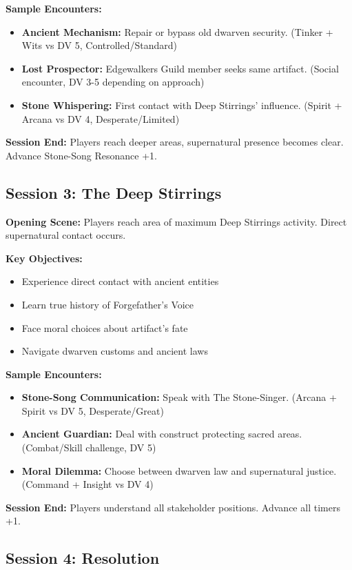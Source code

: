\documentclass[11pt]{article}
\begin{document}
\textbf{Sample Encounters:}
\begin{itemize}
\item \textbf{Ancient Mechanism:} Repair or bypass old dwarven security. (Tinker + Wits vs DV 5, Controlled/Standard)
\item \textbf{Lost Prospector:} Edgewalkers Guild member seeks same artifact. (Social encounter, DV 3-5 depending on approach)
\item \textbf{Stone Whispering:} First contact with Deep Stirrings' influence. (Spirit + Arcana vs DV 4, Desperate/Limited)
\end{itemize}

\textbf{Session End:} Players reach deeper areas, supernatural presence becomes clear. Advance Stone-Song Resonance +1.

\subsection{Session 3: The Deep Stirrings}

\textbf{Opening Scene:} Players reach area of maximum Deep Stirrings activity. Direct supernatural contact occurs.

\textbf{Key Objectives:}
\begin{itemize}
\item Experience direct contact with ancient entities
\item Learn true history of Forgefather's Voice
\item Face moral choices about artifact's fate
\item Navigate dwarven customs and ancient laws
\end{itemize}

\textbf{Sample Encounters:}
\begin{itemize}
\item \textbf{Stone-Song Communication:} Speak with The Stone-Singer. (Arcana + Spirit vs DV 5, Desperate/Great)
\item \textbf{Ancient Guardian:} Deal with construct protecting sacred areas. (Combat/Skill challenge, DV 5)
\item \textbf{Moral Dilemma:} Choose between dwarven law and supernatural justice. (Command + Insight vs DV 4)
\end{itemize}

\textbf{Session End:} Players understand all stakeholder positions. Advance all timers +1.

\subsection{Session 4: Resolution}
\end{document}
